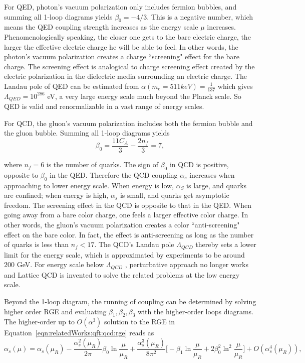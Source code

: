 For QED, photon's vacuum polarization only includes fermion bubbles, and summing all 1-loop diagrams yields $\beta_0 = -4/3$. This is a negative number, which means the QED coupling strength increases as the energy scale $\mu$ increases. Phenomenologically speaking,  the closer one gets to the bare electric charge, the larger the effective electric charge he will be able to feel. In other words, the photon's vacuum polarization creates a charge ``screening" effect for the bare charge. The screening effect is analogical to charge screening effect created by the electric polarization in the dielectric media surrounding an electric charge. The Landau pole of QED can be estimated from $\alpha(m_e=511keV) = \frac{1}{137}$ which gives $\Lambda_{QED}=10^{286}$ eV, a very large energy scale much beyond the Planck scale. So QED is valid and renormalizable in a vast range of energy scales.



For QCD, the gluon's vacuum polarization includes both the fermion bubble and the gluon bubble. Summing all 1-loop diagrams yields
\begin{equation}
	\beta_0 = \frac{11C_A}{3} - \frac{2 n_f}{3} = 7 , 
\end{equation}

\noindent where $n_f=6$ is the number of quarks. The sign of $\beta_0$  in QCD is positive, opposite to $\beta_0$ in the QED. Therefore the QCD coupling $\alpha_s$  increases when approaching to lower energy scale. When energy is low, $\alpha_S$ is large, and quarks are confined; when energy is high, $\alpha_s$ is small, and quarks get asymptotic freedom. The screening effect in the QCD is opposite to that in the QED. When going away from a bare color charge, one feels a larger effective color charge. In other words, the gluon's vacuum polarization creates a color ``anti-screening" effect on the bare color. In fact, the effect is anti-screening as long as the number of quarks is less than $n_f<17$. The QCD's Landau pole $\Lambda_{QCD}$ thereby sets a lower limit for the energy scale, which is approximated by experiments to be around $200$ GeV. For energy scale below $\Lambda_{QCD}$ , perturbative approach no longer works and Lattice QCD is invented to solve the related problems at the low energy scale.


Beyond the 1-loop diagram, the running of coupling can be determined by solving higher order RGE and evaluating $\beta_1,\beta_2,\beta_3$ with the higher-order loops diagrams. The higher-order up to $O(\alpha^3)$ solution to the RGE in Equation~\ref{eqn:relatedWorks:qft:qcd:rge} reads as \cite{schwartz2014quantum}
\begin{equation}
    \alpha_s(\mu) = \alpha_s(\mu_R) - \frac{\alpha^2_s(\mu_R)}{2\pi}\beta_0 \ln \frac{\mu}{\mu_R} + \frac{\alpha^3_s(\mu_R)}{8\pi^2} \bigg[ -\beta_1 \ln \frac{\mu}{\mu_R}  + 2 \beta_0 ^2 \ln^2 \frac{\mu}{\mu_R} \bigg ] + O(\alpha^4_s(\mu_R)), 
    \label{eqn:relatedWorks:qft:qcd:higherOrderRunning}
\end{equation}


